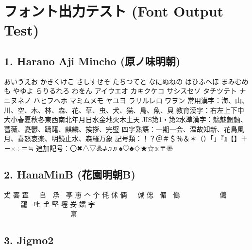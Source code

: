 \documentclass[12pt]{ltjsarticle}
\begin{document}
\section*{フォント出力テスト (Font Output Test)}

\subsection*{1. Harano Aji Mincho (原ノ味明朝)}
あいうえお かきくけこ さしすせそ たちつてと なにぬねの
はひふへほ まみむめも やゆよ らりるれろ わをん
アイウエオ カキクケコ サシスセソ タチツテト ナニヌネノ
ハヒフヘホ マミムメモ ヤユヨ ラリルレロ ワヲン
常用漢字：海、山、川、空、木、林、森、花、草、虫、犬、猫、鳥、魚、貝
教育漢字：右左上下中大小春夏秋冬東西南北年月日水金地火木土天
JIS第1・第2水準漢字：魑魅魍魎、薔薇、憂鬱、躊躇、麒麟、挨拶、完璧
四字熟語：一期一会、温故知新、花鳥風月、喜怒哀楽、明鏡止水、森羅万象
記号類：！？＠＃＄％＆＊（）「」『』【】＋－×÷＝≒
追加記号：〇✖△▽♨♪♫♬♠♡♣♢★☆※〒〠

\subsection*{2. HanaMinB (花園明朝B)}
{\HanaBFont
𠀋 𠀾 𠁆 𠁕 𠁣 𠂤 𠃓 𠄘 𠄡 𠅘 𠅤 𠆢 𠆤 𠇔 𠇲
𠈓 𠈲 𠉙 𠉛 𠊞 𠊟 𠋥 𠋤 𠌥 𠌤 𠍥 𠍤 𠎥 𠎤 𠏥
𠏤 𠐥 𠐤 𠑥 𠑤 𠒥 𠒤 𠓥 𠓤 𠔥 𠔤 𠕥 𠕤 𠖥 𠖤
𠮟 𡈽 𡌛 𡑮 𡚴 𡢽 𡧃 𡨸 𡫏 𡮣
𡿖 𡿗 𡿘 𡿙 𡿚 𡿛 𡿜 𡿝 𡿞 𡿟 𡿠 𡿡 𡿢 𡿣 𡿤
𢀖 𢀗 𢀘 𢀙 𢀚 𢀛 𢀜 𢀝 𢀞 𢀟 𢀠 𢀡 𢀢 𢀣 𢀤
𢁖 𢁗 𢁘 𢁙 𢁚 𢁛 𢁜 𢁝 𢁞 𢁟 𢁠 𢁡 𢁢 𢁣 𢁤
𢂖 𢂗 𢂘 𢂙 𢂚 𢂛 𢂜 𢂝 𢂞 𢂟 𢂠 𢂡 𢂢 𢂣 𢂤
𢃖 𢃗 𢃘 𢃙 𢃚 𢃛 𢃜 𢃝 𢃞 𢃟 𢃠 𢃡 𢃢 𢃣 𢃤
}

\subsection*{3. Jigmo2}
{\JigmoIIFont
𪜀 𪜁 𪜂 𪜃 𪜄 𪜅 𪜆 𪜇 𪜈 𪜉 𪜊 𪜋 𪜌 𪜍 𪜎
𪜏 𪜐 𪜑 𪜒 𪜓 𪜔 𪜕 𪜖 𪜗 𪜘 𪜙 𪜚 𪜛 𪜜 𪜝
𫝀 𫝁 𫝂 𫝃 𫝄 𫝅 𫝆 𫝇 𫝈 𫝉 𫝊 𫝋 𫝌 𫝍 𫝎
𫝏 𫝐 𫝑 𫝒 𫝓 𫝔 𫝕 𫝖 𫝗 𫝘 𫝙 𫝚 𫝛 𫝜 𫝝
𫠠 𫠡 𫠢 𫠣 𫠤 𫠥 𫠦 𫠧 𫠨 𫠩 𫠪 𫠫 𫠬 𫠭 𫠮
𫠯 𫠰 𫠱 𫠲 𫠳 𫠴 𫠵 𫠶 𫠷 𫠸 𫠹 𫠺 𫠻 𫠼 𫠽
𬺰 𬺱 𬺲 𬺳 𬺴 𬺵 𬺶 𬺷 𬺸 𬺹 𬺺 𬺻 𬺼 𬺽 𬺾
𬺿 𬻀 𬻁 𬻂 𬻃 𬻄 𬻅 𬻆 𬻇 𬻈 𬻉 𬻊 𬻋 𬻌 𬻍
}
\end{document}
